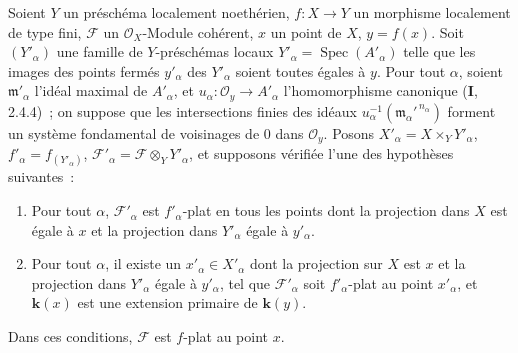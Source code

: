 \begin{theorem}[11.5.1]
\label{IV.11.5.1-fr}
Soient $Y$ un préschéma localement noethérien, $f:X\to Y$ un morphisme
localement de type fini, $\mathcal F$ un $\mathcal O_X$-Module cohérent, $x$ un
point de $X$, $y=f(x)$. Soit $(Y'_\alpha)$ une famille de $Y$-préschémas locaux
$Y'_\alpha=\operatorname{Spec}(A'_\alpha)$ telle que les images des points
fermés $y'_\alpha$ des $Y'_\alpha$ soient toutes égales à $y$. Pour tout
$\alpha$, soient $\mathfrak m'_\alpha$ l'idéal maximal de $A'_\alpha$, et
$u_\alpha:\mathcal O_y\to A'_\alpha$
l'homomorphisme canonique
\textup{(\textbf I, 2.4.4)}~; on suppose que les intersections finies des idéaux
$u_\alpha^{-1}(\mathfrak m_\alpha'^{\,n_\alpha})$ forment un système fondamental
de voisinages de $0$ dans $\mathcal O_y$. Posons
$X'_\alpha=X\times_Y Y'_\alpha$, $f'_\alpha=f_{(Y'_\alpha)}$,
$\mathcal F'_\alpha=\mathcal F\otimes_Y Y'_\alpha$, et supposons vérifiée \textup{l'une}
des hypothèses suivantes~:
\begin{enumerate}[label=\textup{(\roman*)}]
  \item Pour tout $\alpha$, $\mathcal F'_\alpha$ est $f'_\alpha$-plat en \textup{tous}
  les points dont la projection dans $X$ est égale à $x$ et la projection dans
  $Y'_\alpha$ égale à $y'_\alpha$.
  \item Pour tout $\alpha$, il existe un $x'_\alpha\in X'_\alpha$ dont la
  projection sur $X$ est $x$ et la projection dans $Y'_\alpha$ égale à
  $y'_\alpha$, tel que $\mathcal F'_\alpha$ soit $f'_\alpha$-plat au point
  $x'_\alpha$, et $\boldsymbol{k}(x)$ est une extension primaire de $\boldsymbol{k}(y)$.
\end{enumerate}

Dans ces conditions, $\mathcal F$ est $f$-plat au point $x$.
\end{theorem}

